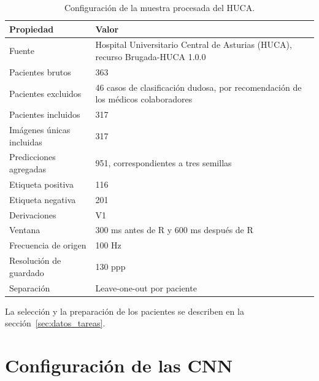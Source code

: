 \begin{table}[H]
  \centering
  \small
  \begin{tabularx}{0.94\textwidth}{p{4.4cm}X}
    \toprule
    Propiedad & Valor \\
    \midrule
    Fuente & Hospital Universitario Central de Asturias (HUCA), recurso Brugada-HUCA 1.0.0 \\
    Pacientes brutos & 363 \\
    Pacientes excluidos & 46 casos de clasificación dudosa, por recomendación de los médicos colaboradores \\
    Pacientes incluidos & 317 \\
    Imágenes únicas incluidas & 317 \\
    Predicciones agregadas & 951, correspondientes a tres semillas \\
    Etiqueta positiva & 116 \\
    Etiqueta negativa & 201 \\
    Derivaciones & V1 \\
    Ventana & 300 ms antes de R y 600 ms después de R \\
    Frecuencia de origen & 100 Hz \\
    Resolución de guardado & 130 ppp \\
    Separación & Leave-one-out por paciente \\
    \bottomrule
  \end{tabularx}
  \caption{Configuración de la muestra procesada del HUCA.}
  \label{tab:config_huca_final}
\end{table}

La selección y la preparación de los pacientes se describen en la sección~\ref{sec:datos_tareas}.

\section{Configuración de las CNN}

